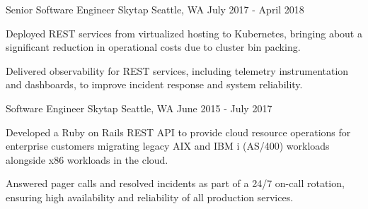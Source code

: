 \begin{cventries}
  \cventry
    {Senior Software Engineer} %
    {Skytap} %
    {Seattle, WA} %
    {July 2017 - April 2018} %
    {
      \begin{cvitems} %
        \item {Deployed REST services from virtualized hosting to Kubernetes, bringing about a significant reduction in operational costs due to cluster bin packing.}
        \item {Delivered observability for REST services, including telemetry instrumentation and dashboards, to improve incident response and system reliability.}
      \end{cvitems}
    }

  \cventry
    {Software Engineer} %
    {Skytap} %
    {Seattle, WA} %
    {June 2015 - July 2017} %
    {
      \begin{cvitems} %
        \item {Developed a Ruby on Rails REST API to provide cloud resource operations for enterprise customers migrating legacy AIX and IBM i (AS/400) workloads alongside x86 workloads in the cloud.}
        \item {Answered pager calls and resolved incidents as part of a 24/7 on-call rotation, ensuring high availability and reliability of all production services.}
      \end{cvitems}
    }

\end{cventries}
